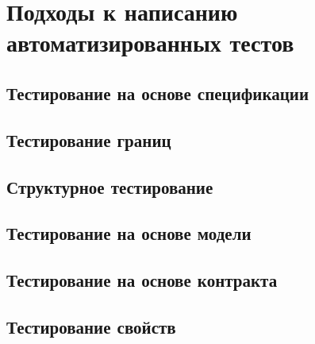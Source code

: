 \section{Подходы к написанию автоматизированных тестов} 



\subsection{Тестирование на основе спецификации} 

 

\subsection{Тестирование границ} 
 
 

\subsection{Структурное тестирование} 
 
 

\subsection{Тестирование на основе модели} 
 
 

\subsection{Тестирование на основе контракта} 
 


\subsection{Тестирование свойств} 

